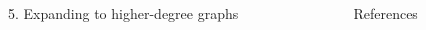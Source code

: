 \documentclass[]{templates/poster}
\begin{document}
\begin{frame}{}
\begin{columns}[t]
  \begin{column}{0.422\linewidth}
  \begin{block}{5. Expanding to higher-degree graphs}
  \end{block}
  \end{column}
  \begin{column}{0.422\linewidth}
  \begin{block}{References}
  \end{block}
  \end{column}
\end{columns}

\end{frame}

\end{document}
